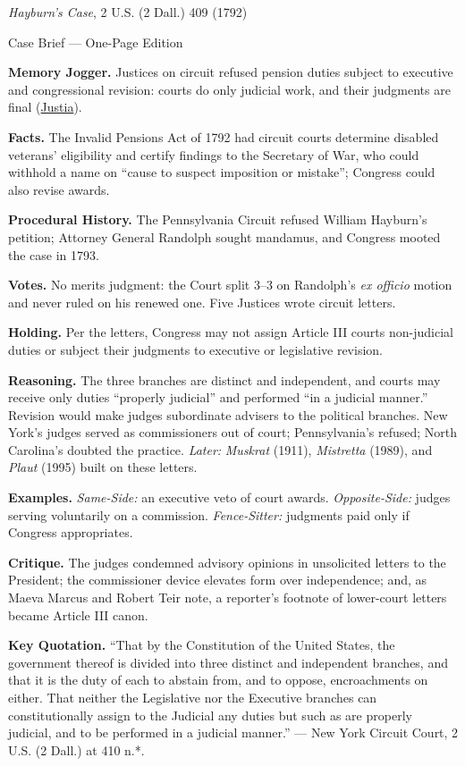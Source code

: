 \documentclass[12pt]{article}
\begin{document}
\begin{center}
{\Large \textit{Hayburn's Case}, 2 U.S. (2 Dall.) 409 (1792)\par}
\vspace{0.3em}
{\normalsize Case Brief --- One-Page Edition\par}
\end{center}

\textbf{Memory Jogger.} Justices on circuit refused pension duties subject to executive and congressional revision: courts do only judicial work, and their judgments are final (\href{https://supreme.justia.com/cases/federal/us/2/409/}{Justia}).

\textbf{Facts.} The Invalid Pensions Act of 1792 had circuit courts determine disabled veterans' eligibility and certify findings to the Secretary of War, who could withhold a name on ``cause to suspect imposition or mistake''; Congress could also revise awards.

\textbf{Procedural History.} The Pennsylvania Circuit refused William Hayburn's petition; Attorney General Randolph sought mandamus, and Congress mooted the case in 1793.

\textbf{Votes.} No merits judgment: the Court split 3--3 on Randolph's \textit{ex officio} motion and never ruled on his renewed one. Five Justices wrote circuit letters.

\textbf{Holding.} Per the letters, Congress may not assign Article III courts non-judicial duties or subject their judgments to executive or legislative revision.

\textbf{Reasoning.} The three branches are distinct and independent, and courts may receive only duties ``properly judicial'' and performed ``in a judicial manner.'' Revision would make judges subordinate advisers to the political branches. New York's judges served as commissioners out of court; Pennsylvania's refused; North Carolina's doubted the practice. \emph{Later:} \textit{Muskrat} (1911), \textit{Mistretta} (1989), and \textit{Plaut} (1995) built on these letters.

\textbf{Examples.} \emph{Same-Side:} an executive veto of court awards. \emph{Opposite-Side:} judges serving voluntarily on a commission. \emph{Fence-Sitter:} judgments paid only if Congress appropriates.

\textbf{Critique.} The judges condemned advisory opinions in unsolicited letters to the President; the commissioner device elevates form over independence; and, as Maeva Marcus and Robert Teir note, a reporter's footnote of lower-court letters became Article III canon.

\textbf{Key Quotation.} ``That by the Constitution of the United States, the government thereof is divided into three distinct and independent branches, and that it is the duty of each to abstain from, and to oppose, encroachments on either. That neither the Legislative nor the Executive branches can constitutionally assign to the Judicial any duties but such as are properly judicial, and to be performed in a judicial manner.'' --- New York Circuit Court, 2 U.S. (2 Dall.) at 410 n.*.
\end{document}
